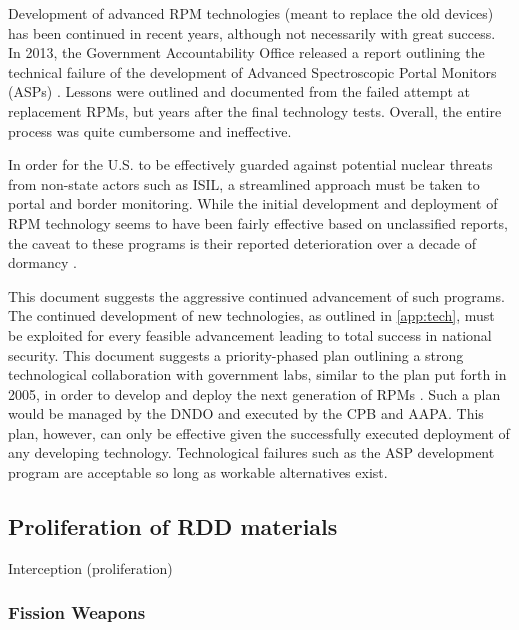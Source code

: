 \documentclass{report}
\begin{document}
Development of advanced RPM technologies (meant to replace the old devices) has been continued in recent years, although not necessarily with great success. In 2013, the Government Accountability Office released a report outlining the technical failure of the development of Advanced Spectroscopic Portal Monitors (ASPs) \cite{UnitedStatesGovernmentAccountabilityOffice2013}. Lessons were outlined and documented from the failed attempt at replacement RPMs, but years after the final technology tests. Overall, the entire process was quite cumbersome and ineffective. 

In order for the U.S. to be effectively guarded against potential nuclear threats from non-state actors such as ISIL, a streamlined approach must be taken to portal and border monitoring. While the initial development and deployment of RPM technology seems to have been fairly effective based on unclassified reports, the caveat to these programs is their reported deterioration over a decade of dormancy \cite{Simmons2005,DepartmentofHomelandSecurityDHS2013}. 


This document suggests the aggressive continued advancement of such programs. The continued development of new technologies, as outlined in \autoref{app:tech}, must be exploited for every feasible advancement leading to total success in national security. This document suggests a priority-phased plan outlining a strong technological collaboration with government labs, similar to the plan put forth in 2005, in order to develop and deploy the next generation of RPMs \cite{Simmons2005}. Such a plan would be managed by the DNDO and executed by the CPB and AAPA. This plan, however, can only be effective given the successfully executed deployment of any developing technology. Technological failures such as the ASP development program are acceptable so long as workable alternatives exist. 




\subsection{Proliferation of RDD materials}

Interception (proliferation)
 
\subsubsection{Fission Weapons}
\end{document}
